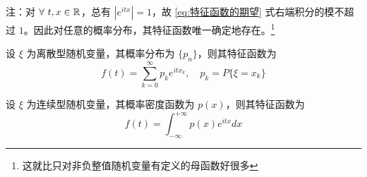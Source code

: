 \documentclass[12pt,a4paper]{amsart}
\begin{document}
注：对 $\forall ~ t,x\in \mathbb{R}$，总有 $|e^{itx}| = 1$，故 \ref{eq:特征函数的期望} 式右端积分的模不超过 $1$。因此对任意的概率分布，其特征函数唯一确定地存在。\footnote{这就比只对非负整值随机变量有定义的母函数好很多}

\begin{definition}[离散型随机变量的特征函数]
    设 $\xi$ 为离散型随机变量，其概率分布为 $\{p_n\}$，则其特征函数为
    \begin{equation}
        f(t) = \sum_{k=0}^{\infty} p_k e^{itx_k},\quad p_k = P\{\xi = x_k\}
    \end{equation}
\end{definition}

\begin{definition}[连续型随机变量的特征函数]
    设 $\xi$ 为连续型随机变量，其概率密度函数为 $p(x)$，则其特征函数为
    \begin{equation}
        f(t) = \int_{-\infty}^{+\infty} p(x) e^{itx} dx
    \end{equation}
\end{definition}
\end{document}
